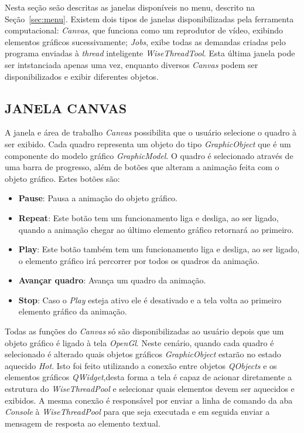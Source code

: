 Nesta seção seão descritas as janelas disponíveis no menu, descrito na Seção~\ref{sec:menu}. Existem dois tipos de janelas disponibilizadas pela ferramenta computacional: \textit{Canvas}, que funciona como um reprodutor de vídeo, exibindo elementos gráficos sucessivamente; \textit{Jobs}, exibe todas as demandas criadas pelo programa enviadas à \textit{thread} inteligente \textit{WiseThreadTool}. Esta última janela pode ser intstanciada apenas uma vez, enquanto diversos \textit{Canvas} podem ser disponibilizados e exibir diferentes objetos.

\subsection{JANELA CANVAS}\label{sec:janela_canvas}

A janela e área de trabalho \textit{Canvas} possibilita que o usuário selecione o quadro à ser exibido. Cada quadro representa um objeto do tipo \textit{GraphicObject} que é um componente do modelo gráfico \textit{GraphicModel}. O quadro é selecionado através de uma barra de progresso, além de botões que alteram a animação feita com o objeto gráfico. Estes botões são:

\begin{itemize}
	\item \textbf{Pause}: Pausa a animação do objeto gráfico.
	\item \textbf{Repeat}: Este botão tem um funcionamento liga e desliga, ao ser ligado, quando a animação chegar ao último elemento gráfico retornará ao primeiro.
	\item \textbf{Play}: Este botão também tem um funcionamento liga e desliga, ao ser ligado, o elemento gráfico irá percorrer por todos os quadros da animação.
	\item \textbf{Avançar quadro}: Avança um quadro da animação.
	\item \textbf{Stop}: Caso o \textit{Play} esteja ativo ele é desativado e a tela volta ao primeiro elemento gráfico da animação.
\end{itemize}

Todas as funções do \textit{Canvas} só são disponibilizadas ao usuário depois que um objeto gráfico é ligado à tela \textit{OpenGl}. Neste cenário, quando cada quadro é selecionado é alterado quais objetos gráficos \textit{GraphicObject} estarão no estado aquecido \textit{Hot}. Isto foi feito utilizando a conexão entre objetos \textit{QObjects} e os elementos gráficos \textit{QWidget},desta forma a tela é capaz de acionar diretamente a estrutura do \textit{WiseThreadPool} e selecionar quais elementos devem ser aquecidos e exibidos. A mesma conexão é responsável por enviar a linha de comando da aba \textit{Console} à \textit{WiseThreadPool} para que seja executada e em seguida enviar a mensagem de resposta ao elemento textual.

